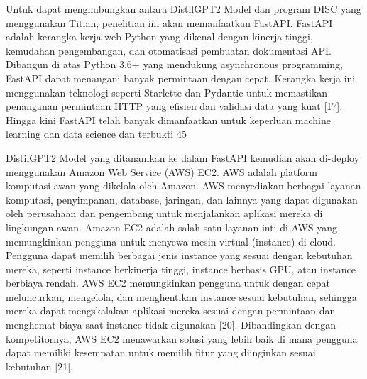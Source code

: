 Untuk dapat menghubungkan antara DistilGPT2 Model dan program DISC yang menggunakan Titian, penelitian ini akan memanfaatkan FastAPI. FastAPI adalah kerangka kerja web Python yang dikenal dengan kinerja tinggi, kemudahan pengembangan, dan otomatisasi pembuatan dokumentasi API. Dibangun di atas Python 3.6+ yang mendukung asynchronous programming, FastAPI dapat menangani banyak permintaan dengan cepat. Kerangka kerja ini menggunakan teknologi seperti Starlette dan Pydantic untuk memastikan penanganan permintaan HTTP yang efisien dan validasi data yang kuat [17]. Hingga kini FastAPI telah banyak dimanfaatkan untuk keperluan machine learning dan data science dan terbukti 45%

DistilGPT2 Model yang ditanamkan ke dalam FastAPI kemudian akan di-deploy menggunakan Amazon Web Service (AWS) EC2. AWS adalah platform komputasi awan yang dikelola oleh Amazon. AWS menyediakan berbagai layanan komputasi, penyimpanan, database, jaringan, dan lainnya yang dapat digunakan oleh perusahaan dan pengembang untuk menjalankan aplikasi mereka di lingkungan awan. Amazon EC2 adalah salah satu layanan inti di AWS yang memungkinkan pengguna untuk menyewa mesin virtual (instance) di cloud. Pengguna dapat memilih berbagai jenis instance yang sesuai dengan kebutuhan mereka, seperti instance berkinerja tinggi, instance berbasis GPU, atau instance berbiaya rendah. AWS EC2 memungkinkan pengguna untuk dengan cepat meluncurkan, mengelola, dan menghentikan instance sesuai kebutuhan, sehingga mereka dapat mengskalakan aplikasi mereka sesuai dengan permintaan dan menghemat biaya saat instance tidak digunakan [20]. Dibandingkan dengan kompetitornya, AWS EC2 menawarkan solusi yang lebih baik di mana pengguna dapat memiliki kesempatan untuk memilih fitur yang diinginkan sesuai kebutuhan [21].

